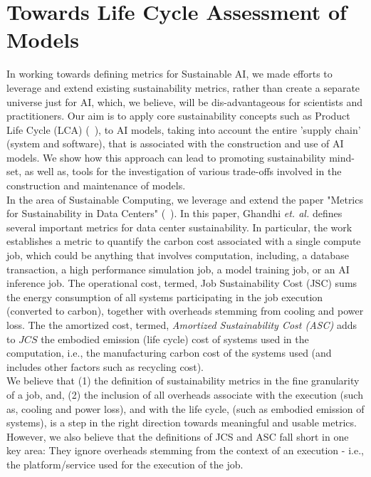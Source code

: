 \section{Towards Life Cycle Assessment of Models}
\label{metrics}
In working towards defining metrics for Sustainable AI, we made efforts to leverage and 
extend existing sustainability metrics, rather than create a separate universe just for AI, which, we believe, will be 
dis-advantageous for scientists and practitioners. 
Our aim is to apply core sustainability concepts such as Product Life Cycle (LCA) (~\cite{}), 
to AI models, taking into account the entire 'supply chain' (system and software), 
that is associated with the construction and use of AI models. We show how this approach 
can lead to promoting sustainability mind-set, as well as, tools for the investigation of various 
trade-offs involved in the construction and maintenance of models. 
\\
In the area of Sustainable Computing, we leverage and extend the paper "Metrics for Sustainability in Data Centers" (~\cite{gandhi2022metrics}). 
In this paper, Ghandhi {\it et. al.} defines several important metrics for data center sustainability. 
In particular, the work establishes a metric to 
quantify the carbon cost associated with a single compute job, 
which could be anything that involves
computation, including, a database transaction, a high performance simulation job, a model training job, 
or an AI inference job. The operational cost, termed, Job Sustainability Cost (JSC) sums the energy 
consumption of all systems participating in the job execution (converted to carbon), together with overheads stemming from cooling and power loss. The the amortized cost, termed, {\it Amortized Sustainability Cost (ASC)} adds to $JCS$ the embodied emission (life cycle) cost of systems used in the computation, i.e., the manufacturing carbon cost of the systems used (and includes other factors such as recycling cost).
\\
We believe that (1) the definition of sustainability metrics in the fine granularity of a job, and, (2) the inclusion of all overheads associate with the execution (such as, cooling and power loss), and with the life cycle, (such as 
embodied emission of systems), is a step in the right direction towards meaningful and usable metrics. 
However, we also believe that the definitions of JCS and ASC fall short in one key area: They 
ignore overheads stemming from the context of an execution - i.e.,  the platform/service used for the execution
of the job. 
\\

